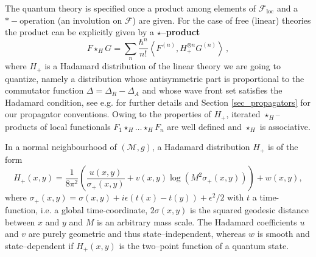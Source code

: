 \documentclass[a4paper,10pt,twoside]{article}
\numberwithin{equation}{section}
\newcounter{and}
\def\M{\mathcal{M}}
\def\loc{\mathrm{loc}}
\def\beq{\begin{equation}}
\def\eeq{\end{equation}}
\theoremstyle{plain}
\theoremstyle{definition}
\begin{document}
The quantum theory is specified once a product among elements of $\mathcal{F}_\loc$ and a $*-$operation (an involution on $\mathcal{F}$) are given. For the case of free (linear) theories the product can be explicitly given by a {\bf $\star$--product }
\beq\label{def:starH}
F \star_H  G =  \sum_n \frac{\hbar^n}{n!}\left\langle F^{(n)}, H_+^{\otimes n} G^{(n)} \right\rangle\,,
\eeq
where $H_+$ is a Hadamard distribution of the linear theory we are going to quantize, namely a distribution whose antisymmetric part is proportional to the commutator function $\Delta=\Delta_R-\Delta_A$ and whose wave front set satisfies the Hadamard condition, see e.g. \cite{Radzikowski, bfk:1996} for further details and Section \ref{sec_propagators} for our propagator conventions. Owing to the properties of $H_+$, iterated $\star_H$--products of local functionals $F_1 \star_H \dots \star_H F_n$ are well defined and $\star_H$ is associative.

In a normal neighbourhood of $(\M,g)$, a Hadamard distribution $H_+$ is of the form
\begin{equation}\label{eq:hadamard}
H_+(x,y)=\frac{1}{8\pi^2}\left(\frac{u(x,y)}{\sigma_+(x,y)}+v(x,y)\log(M^2 \sigma_+(x,y))\right)+w(x,y),
\end{equation}
where $\sigma_+(x,y)=\sigma(x,y)+i\epsilon (t(x)-t(y))+\epsilon^2/2$ with $t$ a time-function, i.e. a global time-coordinate, $2\sigma(x,y)$ is the squared geodesic distance between $x$ and $y$ and $M$ is an arbitrary mass scale. The Hadamard coefficients $u$ and $v$ are purely geometric and thus state--independent, whereas $w$ is smooth and state--dependent if $H_+(x,y)$ is the two--point function of a quantum state.
\end{document}
